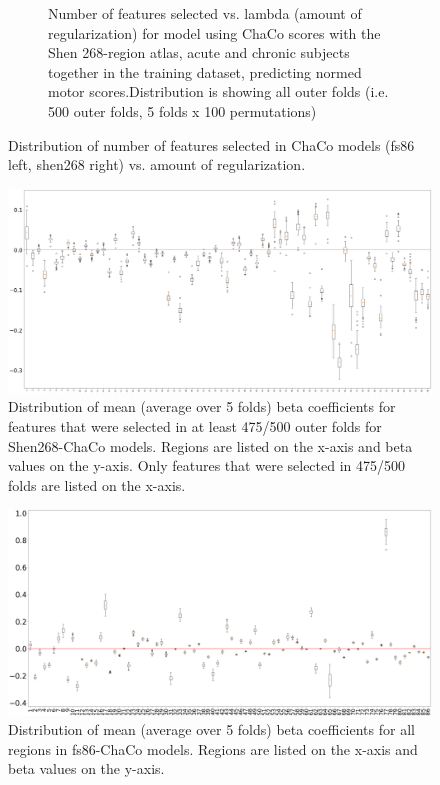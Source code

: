 \documentclass[10pt]{article}
\begin{document}
\begin{figure}
\begin{subfigure}{0.5\textwidth}
  \caption{Number of features selected vs. lambda (amount of regularization) for model using ChaCo scores with the Shen 268-region atlas, acute and chronic subjects together in the training dataset, predicting normed motor scores.Distribution is showing all outer folds (i.e. 500 outer folds, 5 folds x 100 permutations)} 
  \label{fig:sfig2}
\end{subfigure}
\caption{Distribution of number of features selected in ChaCo models (fs86 left, shen268 right) vs. amount of regularization.}
\label{lambda_kappa}
\end{figure}


\begin{figure}[htp]
\centering
\includegraphics[width=1\linewidth]{figures/distribution_mean_beta_only_top95.png}
\caption{Distribution of mean (average over 5 folds) beta coefficients for features that were selected in at least 475/500 outer folds for Shen268-ChaCo models. Regions are listed on the x-axis and beta values on the y-axis. Only features that were selected in 475/500 folds are listed on the x-axis.}
\label{shen_beta_coeffs}
\end{figure}


\begin{figure}[htp]
\centering
\includegraphics[width=1\linewidth]{figures/distribution_mean_beta_only_top95_fs.png}
\caption{ Distribution of mean (average over 5 folds) beta coefficients for all regions in fs86-ChaCo models. Regions are listed on the x-axis and beta values on the y-axis.}
\label{fs_beta_coeffs}
\end{figure}
\end{document}
